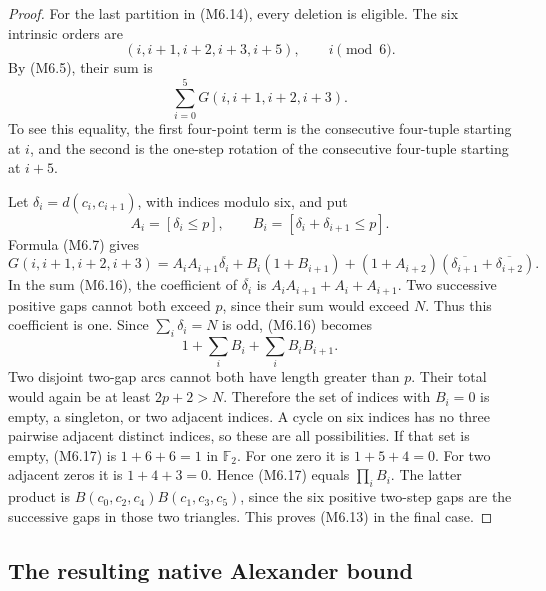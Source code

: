 \documentclass[11pt,oneside]{report}
\theoremstyle{definition}
\numberwithin{equation}{section}
\begin{document}
\begin{proof}
For the last partition in (M6.14), every deletion is eligible.
The six intrinsic orders are
\[
              (i,i+1,i+2,i+3,i+5),\qquad i\pmod6.
\]
By (M6.5), their sum is
\[
                       \sum_{i=0}^5G(i,i+1,i+2,i+3).
 \tag{M6.16}
\]
To see this equality, the first four-point term is the consecutive
four-tuple starting at $i$, and the second is the one-step rotation
of the consecutive four-tuple starting at $i+5$.

Let $\delta_i=d(c_i,c_{i+1})$, with indices modulo six, and put
\[
 A_i=[\delta_i\leq p],\qquad B_i=[\delta_i+\delta_{i+1}\leq p].
\]
Formula (M6.7) gives
\[
 G(i,i+1,i+2,i+3)
 =A_iA_{i+1}\overline{\delta_i}
   +B_i(1+B_{i+1})
   +(1+A_{i+2})(\overline{\delta_{i+1}}+
                              \overline{\delta_{i+2}}).
\]
In the sum (M6.16), the coefficient of $\overline{\delta_i}$ is
$A_iA_{i+1}+A_i+A_{i+1}$.
Two successive positive gaps cannot both exceed $p$, since their
sum would exceed $N$. Thus this coefficient is one.
Since $\sum_i\delta_i=N$ is odd, (M6.16) becomes
\[
                         1+\sum_iB_i+\sum_iB_iB_{i+1}.
 \tag{M6.17}
\]
Two disjoint two-gap arcs cannot both have length greater than $p$.
Their total would again be at least $2p+2>N$.
Therefore the set of indices with $B_i=0$ is empty, a singleton,
or two adjacent indices. A cycle on six indices has no three
pairwise adjacent distinct indices, so these are all possibilities.
If that set is empty, (M6.17) is $1+6+6=1$ in $\mathbb F _2$.
For one zero it is $1+5+4=0$.
For two adjacent zeros it is $1+4+3=0$.
Hence (M6.17) equals $\prod_iB_i$.
The latter product is
$B(c_0,c_2,c_4)B(c_1,c_3,c_5)$, since the six positive two-step
gaps are the successive gaps in those two triangles.
This proves (M6.13) in the final case.
\end{proof}

\subsection{The resulting native Alexander bound}
\end{document}
